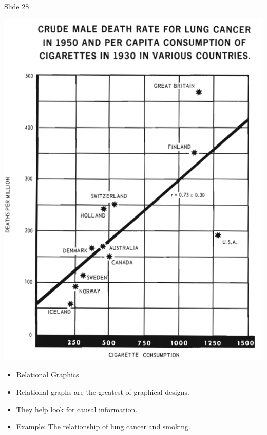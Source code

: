 \documentclass[
  ignorenonframetext,
]{beamer}
\begin{document}
\begin{frame}{Slide 28}
\protect\hypertarget{slide-28}{}
\begin{minipage}{0.45\textwidth}
\centering
\includegraphics[width=\textwidth]{excellence_figs/fig_25.png}
\end{minipage}
\hfill
\begin{minipage}{0.5\textwidth}
\footnotesize
\begin{itemize}
  \item Relational Graphics
  \item Relational graphs are the greatest of graphical designs.
  \item They help look for causal information.
  \item Example: The relationship of lung cancer and smoking.
\end{itemize}
\end{minipage}
\end{frame}
\end{document}
